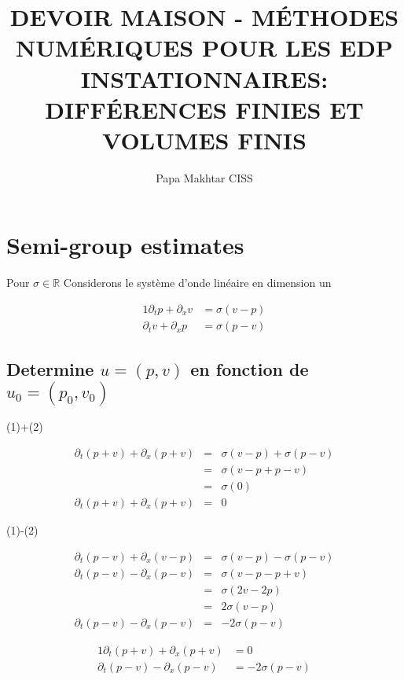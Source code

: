 \documentclass[a4paper,11pt]{article}
\title{\textbf{DEVOIR MAISON - MÉTHODES NUMÉRIQUES POUR LES EDP INSTATIONNAIRES: DIFFÉRENCES FINIES ET VOLUMES FINIS}}
\author{Papa Makhtar CISS}
\begin{document}
\maketitle

\section{Semi-group estimates}
Pour \( \sigma \in \mathbb{R} \)
Considerons le système d'onde linéaire en dimension un

\begin{alignat}{1}
    \partial_{t}p + \partial_{x}v &= \sigma(v-p) \\
    \partial_{t}v + \partial_{x}p &= \sigma(p-v)
\end{alignat}

\subsection{Determine \( u = (p, v) \) en fonction de \( u_{0} = (p_{0}, v_{0}) \)}
(1)+(2)

\begin{equation*}
    \begin{array}{rcl}
        \partial_{t}(p+v) + \partial_{x}(p+v) &=& \sigma(v-p) + \sigma(p-v) \\
        &=& \sigma(v-p + p-v) \\
        &=& \sigma(0) \\
        \partial_{t}(p+v) + \partial_{x}(p+v) &=& 0
    \end{array}
\end{equation*}

(1)-(2)

\begin{equation*}
\begin{array}{rcl}
    \partial_{t}(p-v) + \partial_{x}(v-p) &=& \sigma(v-p) - \sigma(p-v) \\
    \partial_{t}(p-v) - \partial_{x}(p-v) &=& \sigma(v-p - p+v) \\
    &=& \sigma(2v-2p) \\
    &=& 2\sigma(v-p) \\
    \partial_{t}(p-v) - \partial_{x}(p-v) &=& -2\sigma(p-v)
\end{array}
\end{equation*}

\begin{alignat}{1}
    \partial_{t}(p+v) + \partial_{x}(p+v) &= 0 \\
    \partial_{t}(p-v) - \partial_{x}(p-v) &= -2\sigma(p-v)
\end{alignat}
\end{document}
